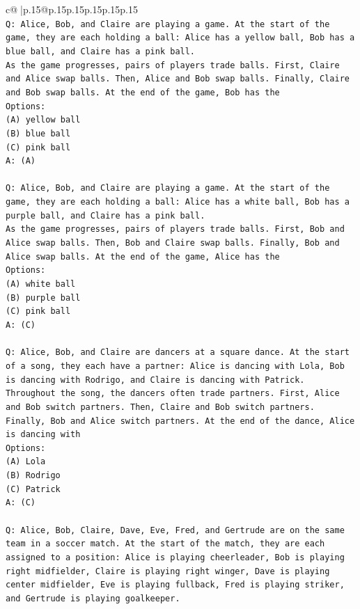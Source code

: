 \documentclass{article}
\begin{document}
{\begin{supertabular}{c@{$\;$}|p{.15\linewidth}@{}p{.15\linewidth}p{.15\linewidth}p{.15\linewidth}p{.15\linewidth}p{.15\linewidth}}
{{{\\ 
\texttt{Q: Alice, Bob, and Claire are playing a game. At the start of the game, they are each holding a ball: Alice has a yellow ball, Bob has a blue ball, and Claire has a pink ball.} \\
\texttt{As the game progresses, pairs of players trade balls. First, Claire and Alice swap balls. Then, Alice and Bob swap balls. Finally, Claire and Bob swap balls. At the end of the game, Bob has the} \\
\texttt{Options:} \\
\texttt{(A) yellow ball} \\
\texttt{(B) blue ball} \\
\texttt{(C) pink ball} \\
\texttt{A: (A)} \\
\\ 
\texttt{Q: Alice, Bob, and Claire are playing a game. At the start of the game, they are each holding a ball: Alice has a white ball, Bob has a purple ball, and Claire has a pink ball.} \\
\texttt{As the game progresses, pairs of players trade balls. First, Bob and Alice swap balls. Then, Bob and Claire swap balls. Finally, Bob and Alice swap balls. At the end of the game, Alice has the} \\
\texttt{Options:} \\
\texttt{(A) white ball} \\
\texttt{(B) purple ball} \\
\texttt{(C) pink ball} \\
\texttt{A: (C)} \\
\\ 
\texttt{Q: Alice, Bob, and Claire are dancers at a square dance. At the start of a song, they each have a partner: Alice is dancing with Lola, Bob is dancing with Rodrigo, and Claire is dancing with Patrick.} \\
\texttt{Throughout the song, the dancers often trade partners. First, Alice and Bob switch partners. Then, Claire and Bob switch partners. Finally, Bob and Alice switch partners. At the end of the dance, Alice is dancing with} \\
\texttt{Options:} \\
\texttt{(A) Lola} \\
\texttt{(B) Rodrigo} \\
\texttt{(C) Patrick} \\
\texttt{A: (C)} \\
\\ 
\texttt{Q: Alice, Bob, Claire, Dave, Eve, Fred, and Gertrude are on the same team in a soccer match. At the start of the match, they are each assigned to a position: Alice is playing cheerleader, Bob is playing right midfielder, Claire is playing right winger, Dave is playing center midfielder, Eve is playing fullback, Fred is playing striker, and Gertrude is playing goalkeeper.} \\
}}}
\end{supertabular}}
\end{document}
